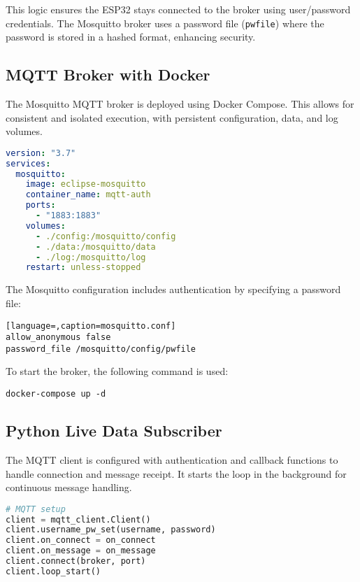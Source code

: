 \documentclass[a4paper,12pt]{article}
\begin{document}
\noindent This logic ensures the ESP32 stays connected to the broker using user/password credentials. The Mosquitto broker uses a password file (\texttt{pwfile}) where the password is stored in a hashed format, enhancing security.

\newpage
\subsection*{MQTT Broker with Docker}

The Mosquitto MQTT broker is deployed using Docker Compose. This allows for consistent and isolated execution, with persistent configuration, data, and log volumes.

\begin{lstlisting}[language=yaml,caption=Docker Compose File]
version: "3.7"
services:
  mosquitto:
    image: eclipse-mosquitto
    container_name: mqtt-auth
    ports:
      - "1883:1883"
    volumes:
      - ./config:/mosquitto/config
      - ./data:/mosquitto/data
      - ./log:/mosquitto/log
    restart: unless-stopped
\end{lstlisting}


\noindent The Mosquitto configuration includes authentication by specifying a password file:

\begin{lstlisting}[language=,caption=mosquitto.conf]
allow_anonymous false
password_file /mosquitto/config/pwfile
\end{lstlisting}

\noindent To start the broker, the following command is used:
\begin{verbatim}
docker-compose up -d
\end{verbatim}

\subsection*{Python Live Data Subscriber}

The MQTT client is configured with authentication and callback functions to handle connection and message receipt. It starts the loop in the background for continuous message handling.

\begin{lstlisting}[language=Python,caption=MQTT Client Setup]
# MQTT setup
client = mqtt_client.Client()
client.username_pw_set(username, password)
client.on_connect = on_connect
client.on_message = on_message
client.connect(broker, port)
client.loop_start()
\end{lstlisting}
\end{document}
